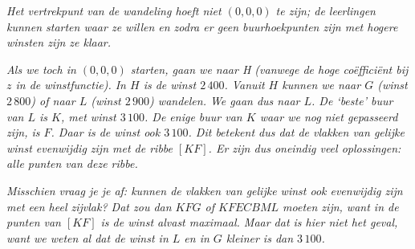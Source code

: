     \emph{Het vertrekpunt van de wandeling hoeft niet $(0, 0, 0)$ te zijn; de leerlingen kunnen starten waar ze willen en zodra er geen buurhoekpunten zijn met hogere winsten zijn ze klaar.}

    \emph{Als we toch in $(0,0,0)$ starten, gaan we naar H (vanwege de hoge coëfficiënt bij $z$ in de winstfunctie). In $H$ is de winst $2\,400$. Vanuit $H$ kunnen we naar $G$ (winst $2\,800$) of naar $L$ (winst $2\,900$) wandelen. We gaan dus naar $L$. De `beste' buur van $L$ is $K$, met winst $3\,100$. De enige buur van $K$ waar we nog niet gepasseerd zijn, is $F$. Daar is de winst ook $3\,100$. Dit betekent dus dat de vlakken van gelijke winst evenwijdig zijn met de ribbe $[KF]$. Er zijn dus oneindig veel oplossingen: alle punten van deze ribbe.}

    \emph{Misschien vraag je je af: kunnen de vlakken van gelijke winst ook evenwijdig zijn met een heel zijvlak? Dat zou dan $KFG$ of $KFECBML$ moeten zijn, want in de punten van $[KF]$ is de winst alvast maximaal. Maar dat is hier niet het geval, want we weten al dat de winst in $L$ en in $G$ kleiner is dan $3\,100$.}

\eindewerktekst

